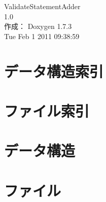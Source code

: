 \documentclass[a4paper]{book}
\begin{document}
\begin{titlepage}
\vspace*{7cm}
\begin{center}
{\Large ValidateStatementAdder \\[1ex]\large 1.0 }\\
\vspace*{1cm}
{\large 作成： Doxygen 1.7.3}\\
\vspace*{0.5cm}
{\small Tue Feb 1 2011 09:38:59}\\
\end{center}
\end{titlepage}
\clearemptydoublepage
{}
\tableofcontents
\clearemptydoublepage
{}
\chapter{データ構造索引}

\chapter{ファイル索引}

\chapter{データ構造}















\chapter{ファイル}


































\printindex
\end{document}
